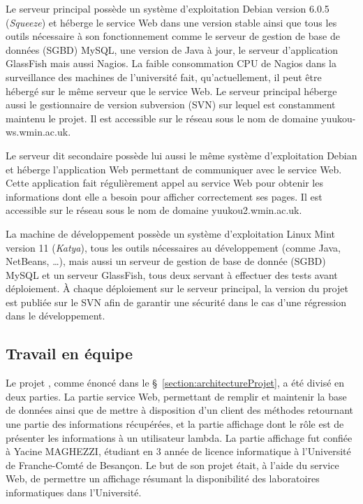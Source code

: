 Le serveur principal poss\`ede un syst\`eme d'exploitation Debian version 6.0.5 (\textit{Squeeze}) et h\'eberge le service Web dans une version stable ainsi que tous les outils n\'ecessaire \`a son fonctionnement comme le serveur de gestion de base de donn\'ees (SGBD) MySQL, une version de Java \`a jour, le serveur d'application GlassFish mais aussi Nagios.
La faible consommation CPU de Nagios dans la surveillance des machines de l'universit\'e fait, qu'actuellement, il peut \^etre h\'eberg\'e sur le m\^eme serveur que le service Web.
Le serveur principal h\'eberge aussi le gestionnaire de version subversion (SVN) sur lequel est constamment maintenu le projet.
Il est accessible sur le r\'eseau sous le nom de domaine \textsf{yuukou-ws.wmin.ac.uk}.

Le serveur dit {\og}secondaire{\fg} poss\`ede lui aussi le m\^eme syst\`eme d'exploitation Debian et h\'eberge l'application Web permettant de communiquer avec le service Web.
Cette application fait r\'eguli\`erement appel au service Web pour obtenir les informations dont elle a besoin pour afficher correctement ses pages.
Il est accessible sur le r\'eseau sous le nom de domaine \textsf{yuukou2.wmin.ac.uk}.

La machine de d\'eveloppement poss\`ede un syst\`eme d'exploitation Linux Mint version 11 (\textit{Katya}), tous les outils n\'ecessaires au d\'eveloppement (comme Java, NetBeans, \ldots), mais aussi un serveur de gestion de base de donn\'ee (SGBD) MySQL et un serveur GlassFish, tous deux servant \`a effectuer des tests avant d\'eploiement.
\`A chaque d\'eploiement sur le serveur principal, la version du projet est publi\'ee sur le SVN afin de garantir une s\'ecurit\'e dans le cas d'une r\'egression dans le d\'eveloppement.

\subsection{Travail en \'equipe}

Le projet {\YuukouII}, comme \'enonc\'e dans le \S~\ref{section:architectureProjet}, a \'et\'e divis\'e en deux parties.
La partie service Web, permettant de remplir et maintenir la base de donn\'ees ainsi que de mettre \`a disposition d'un client des m\'ethodes retournant une partie des informations r\'ecup\'er\'ees, et la partie affichage dont le r\^ole est de pr\'esenter les informations \`a un utilisateur lambda.
La partie affichage fut confi\'ee \`a Yacine MAGHEZZI, \'etudiant en 3 ann\'ee de licence informatique \`a l'Universit\'e de Franche-Comt\'e de Besan\c{c}on.
Le but de son projet \'etait, \`a l'aide du service Web, de permettre un affichage r\'esumant la disponibilit\'e des laboratoires informatiques dans l'Universit\'e.

